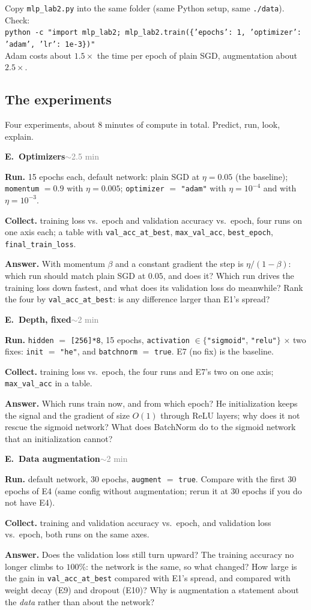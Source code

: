 \documentclass[11pt]{article}
\newcommand{\code}[1]{\texttt{#1}}
\newcounter{exp}
\newenvironment{experiment}[2]{\refstepcounter{exp}\par\medskip
  \textbf{\textcolor{aiblue}{E\theexp.\ #1}}\hfill{\small\textcolor{gray}{#2}}\par}{\par}
\newcommand{\run}[1]{\textbf{Run.} #1\par}
\newcommand{\collect}[1]{\textbf{Collect.} #1\par}
\newcommand{\answer}[1]{\textbf{Answer.} #1\par}
\begin{document}
Copy \code{mlp\_lab2.py} into the same folder (same Python setup, same \code{./data}). Check:\\
\code{python -c "import mlp\_lab2; mlp\_lab2.train(\{'epochs': 1, 'optimizer': 'adam', 'lr': 1e-3\})"}\\
Adam costs about $1.5\times$ the time per epoch of plain SGD, augmentation about $2.5\times$.

\subsection*{The experiments}
Four experiments, about $8$ minutes of compute in total. Predict, run, look, explain.

\begin{experiment}{Optimizers}{$\sim$2.5 min}
\run{15 epochs each, default network: plain SGD at $\eta=0.05$ (the baseline); \code{momentum} $=0.9$ with $\eta=0.005$; \code{optimizer} $=$ \code{"adam"} with $\eta=10^{-4}$ and with $\eta=10^{-3}$.}
\collect{training loss vs.\ epoch and validation accuracy vs.\ epoch, four runs on one axis each; a table with \code{val\_acc\_at\_best}, \code{max\_val\_acc}, \code{best\_epoch}, \code{final\_train\_loss}.}
\answer{With momentum $\beta$ and a constant gradient the step is $\eta/(1-\beta)$: which run should match plain SGD at $0.05$, and does it? Which run drives the training loss down fastest, and what does its validation loss do meanwhile? Rank the four by \code{val\_acc\_at\_best}: is any difference larger than E1's spread?}
\end{experiment}

\begin{experiment}{Depth, fixed}{$\sim$2 min}
\run{\code{hidden} $=$ \code{[256]*8}, 15 epochs, \code{activation} $\in\{$\code{"sigmoid"}, \code{"relu"}$\}$ $\times$ two fixes: \code{init} $=$ \code{"he"}, and \code{batchnorm} $=$ \code{true}. E7 (no fix) is the baseline.}
\collect{training loss vs.\ epoch, the four runs and E7's two on one axis; \code{max\_val\_acc} in a table.}
\answer{Which runs train now, and from which epoch? He initialization keeps the signal and the gradient of size $O(1)$ through ReLU layers; why does it not rescue the sigmoid network? What does BatchNorm do to the sigmoid network that an initialization cannot?}
\end{experiment}

\begin{experiment}{Data augmentation}{$\sim$2 min}
\run{default network, 30 epochs, \code{augment} $=$ \code{true}. Compare with the first 30 epochs of E4 (same config without augmentation; rerun it at 30 epochs if you do not have E4).}
\collect{training and validation accuracy vs.\ epoch, and validation loss vs.\ epoch, both runs on the same axes.}
\answer{Does the validation loss still turn upward? The training accuracy no longer climbs to $100\%$: the network is the same, so what changed? How large is the gain in \code{val\_acc\_at\_best} compared with E1's spread, and compared with weight decay (E9) and dropout (E10)? Why is augmentation a statement about the \emph{data} rather than about the network?}
\end{experiment}
\end{document}
